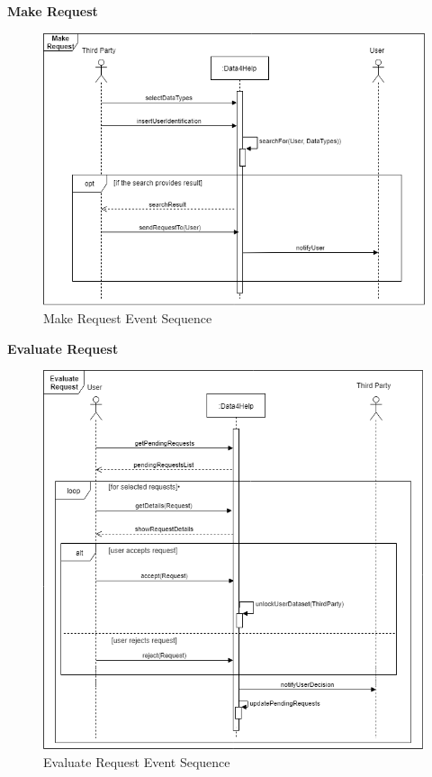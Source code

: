 \textbf{Make Request}\par
\begin{figure}[H]
	\includegraphics[scale=0.55]{Images/UML/MakeRequestSeq.png}
	\captionsetup{justification=raggedright, singlelinecheck=false}
	\vspace*{-2mm}\caption{Make Request Event Sequence}
	\label{figure14}
\end{figure}
\newpage
\textbf{Evaluate Request} \par
\begin{figure}[H]
	\includegraphics[scale=0.9]{Images/UML/EvaluateRequestSeq.png}
	\captionsetup{justification=raggedright, singlelinecheck=false}
	\vspace*{-2mm}\caption{Evaluate Request Event Sequence}
	\label{figure15}
\end{figure}

